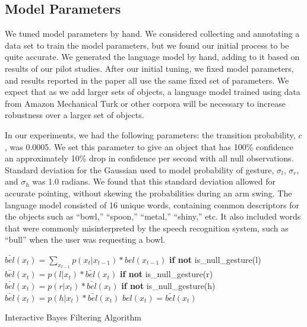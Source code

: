 \documentclass[letterpaper, 10 pt, conference]{ieeeconf}
\begin{document}
\subsection{Model Parameters}
We tuned model parameters by hand.  We considered collecting and
annotating a data set to train the model parameters, but we found our
initial process to be quite accurate. We generated the language model
by hand, adding to it based on results of our pilot
studies. After our initial tuning, we fixed
  model parameters, and results reported in the paper all use the same
  fixed set of parameters. We expect that as we add
larger sets of objects, a language model trained using data from
Amazon Mechanical Turk or other corpora will be necessary to increase
robustness over a larger set of objects.  

In our experiments, we had the following parameters: the transition
probability, $c$, was 0.0005. We set this parameter to give an object
that has 100\% confidence an approximately 10\% drop in confidence per
second with all null observations.  Standard deviation for the
Gaussian used to model probability of gesture, $\sigma_l$, $\sigma_r$,
and $\sigma_h$ was 1.0 radians. We found that this standard deviation
allowed for accurate pointing, without skewing the probabilities
during an arm swing.  The language model consisted of 16 unique words,
containing common descriptors for the objects such as ``bowl,''
``spoon,'' ``metal,'' ``shiny,'' etc. It also included words that were
commonly misinterpreted by the speech recognition system, such as
``bull'' when the user was requesting a bowl.


\begin{algorithm}
    \DontPrintSemicolon
    \BlankLine
    \BlankLine
     {
      $\bar{bel}(x_t) = \displaystyle\sum_{x_{t-1}} p(x_t|x_{t-1})*bel(x_{t-1})$
      \BlankLine
      \textbf{if not} is\_null\_gesture(l)
      \BlankLine
      \Indp$\bar{bel}(x_t) = p(l | x_t) *  \bar{bel}(x_t)$
      \BlankLine
      \Indm\textbf{if not} is\_null\_gesture(r)
      \BlankLine
      \Indp$\bar{bel}(x_t) = p(r | x_t) *  \bar{bel}(x_t)$
      \BlankLine
      \Indm\textbf{if not} is\_null\_gesture(h)
      \BlankLine
      \Indp$\bar{bel}(x_t) = p(h | x_t) *  \bar{bel}(x_t)$
      \BlankLine
      \Indm{}
      $bel(x_t) = \bar{bel}(x_t)$

    }
    \BlankLine
\caption{Interactive Bayes Filtering Algorithm} 
\label{alg:algorithm}
\end{algorithm}
\end{document}
